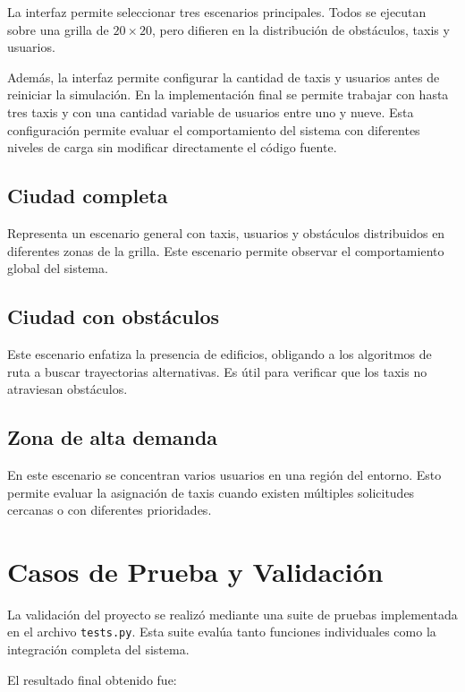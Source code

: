 \documentclass[12pt,a4paper]{article}
\begin{document}
La interfaz permite seleccionar tres escenarios principales. Todos se ejecutan sobre una grilla de $20 \times 20$, pero difieren en la distribución de obstáculos, taxis y usuarios.

Además, la interfaz permite configurar la cantidad de taxis y usuarios antes de reiniciar la simulación. En la implementación final se permite trabajar con hasta tres taxis y con una cantidad variable de usuarios entre uno y nueve. Esta configuración permite evaluar el comportamiento del sistema con diferentes niveles de carga sin modificar directamente el código fuente.

\subsection{Ciudad completa}

Representa un escenario general con taxis, usuarios y obstáculos distribuidos en diferentes zonas de la grilla. Este escenario permite observar el comportamiento global del sistema.

\subsection{Ciudad con obstáculos}

Este escenario enfatiza la presencia de edificios, obligando a los algoritmos de ruta a buscar trayectorias alternativas. Es útil para verificar que los taxis no atraviesan obstáculos.

\subsection{Zona de alta demanda}

En este escenario se concentran varios usuarios en una región del entorno. Esto permite evaluar la asignación de taxis cuando existen múltiples solicitudes cercanas o con diferentes prioridades.

\section{Casos de Prueba y Validación}
\justifying

La validación del proyecto se realizó mediante una suite de pruebas implementada en el archivo \texttt{tests.py}. Esta suite evalúa tanto funciones individuales como la integración completa del sistema.

El resultado final obtenido fue:
\end{document}
